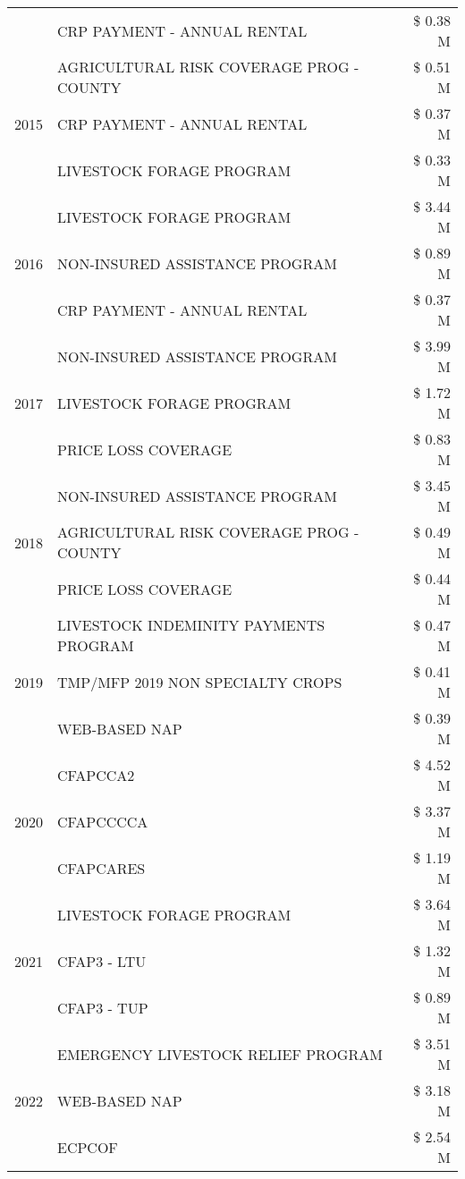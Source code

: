 \begin{tabular}{llr}
 & CRP PAYMENT - ANNUAL RENTAL & \$ 0.38 M \\
\cline{1-3}
\multirow[t]{3}{*}{2015} & AGRICULTURAL RISK COVERAGE PROG - COUNTY & \$ 0.51 M \\
 & CRP PAYMENT - ANNUAL RENTAL & \$ 0.37 M \\
 & LIVESTOCK FORAGE PROGRAM & \$ 0.33 M \\
\cline{1-3}
\multirow[t]{3}{*}{2016} & LIVESTOCK FORAGE PROGRAM & \$ 3.44 M \\
 & NON-INSURED ASSISTANCE PROGRAM & \$ 0.89 M \\
 & CRP PAYMENT - ANNUAL RENTAL & \$ 0.37 M \\
\cline{1-3}
\multirow[t]{3}{*}{2017} & NON-INSURED ASSISTANCE PROGRAM & \$ 3.99 M \\
 & LIVESTOCK FORAGE PROGRAM & \$ 1.72 M \\
 & PRICE LOSS COVERAGE & \$ 0.83 M \\
\cline{1-3}
\multirow[t]{3}{*}{2018} & NON-INSURED ASSISTANCE PROGRAM & \$ 3.45 M \\
 & AGRICULTURAL RISK COVERAGE PROG - COUNTY & \$ 0.49 M \\
 & PRICE LOSS COVERAGE & \$ 0.44 M \\
\cline{1-3}
\multirow[t]{3}{*}{2019} & LIVESTOCK INDEMINITY PAYMENTS PROGRAM & \$ 0.47 M \\
 & TMP/MFP 2019 NON SPECIALTY CROPS & \$ 0.41 M \\
 & WEB-BASED NAP & \$ 0.39 M \\
\cline{1-3}
\multirow[t]{3}{*}{2020} & CFAPCCA2 & \$ 4.52 M \\
 & CFAPCCCCA & \$ 3.37 M \\
 & CFAPCARES & \$ 1.19 M \\
\cline{1-3}
\multirow[t]{3}{*}{2021} & LIVESTOCK FORAGE PROGRAM & \$ 3.64 M \\
 & CFAP3 - LTU & \$ 1.32 M \\
 & CFAP3 - TUP & \$ 0.89 M \\
\cline{1-3}
\multirow[t]{3}{*}{2022} & EMERGENCY LIVESTOCK RELIEF PROGRAM & \$ 3.51 M \\
 & WEB-BASED NAP & \$ 3.18 M \\
 & ECPCOF & \$ 2.54 M \\
\cline{1-3}
\bottomrule
\end{tabular}
